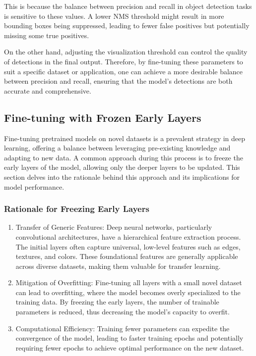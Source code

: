 \documentclass{article}
\begin{document}
This is because the balance between precision and recall in object detection tasks is sensitive to these values. A lower NMS threshold might result in more bounding boxes being suppressed, leading to fewer false positives but potentially missing some true positives. 

On the other hand, adjusting the visualization threshold can control the quality of detections in the final output. Therefore, by fine-tuning these parameters to suit a specific dataset or application, one can achieve a more desirable balance between precision and recall, ensuring that the model's detections are both accurate and comprehensive.

\subsection{Fine-tuning with Frozen Early Layers}

Fine-tuning pretrained models on novel datasets is a prevalent strategy in deep learning, offering a balance between leveraging pre-existing knowledge and adapting to new data. A common approach during this process is to freeze the early layers of the model, allowing only the deeper layers to be updated. This section delves into the rationale behind this approach and its implications for model performance.

\subsubsection{Rationale for Freezing Early Layers}

\begin{enumerate}
\item Transfer of Generic Features: Deep neural networks, particularly convolutional architectures, have a hierarchical feature extraction process. The initial layers often capture universal, low-level features such as edges, textures, and colors. These foundational features are generally applicable across diverse datasets, making them valuable for transfer learning.

\item Mitigation of Overfitting: Fine-tuning all layers with a small novel dataset can lead to overfitting, where the model becomes overly specialized to the training data. By freezing the early layers, the number of trainable parameters is reduced, thus decreasing the model's capacity to overfit.

\item Computational Efficiency: Training fewer parameters can expedite the convergence of the model, leading to faster training epochs and potentially requiring fewer epochs to achieve optimal performance on the new dataset.
\end{enumerate}
\end{document}
